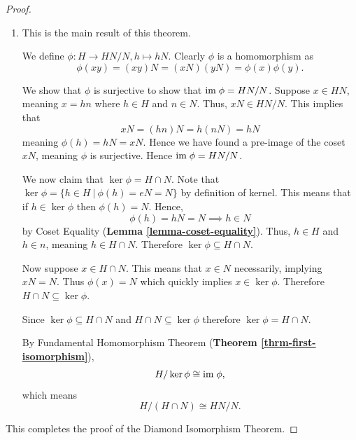 \begin{proof}
\begin{enumerate}
        \item This is the main result of this theorem.

        We define $\phi: H \to HN/N, h \mapsto hN$. Clearly $\phi$ is a homomorphism as
        \[
            \phi(xy) = (xy)N = (xN)(yN) = \phi(x)\phi(y).
        \]

        We show that $\phi$ is surjective to show that $\mathrm{im}\;\phi = HN/N$. Suppose $x \in HN$, meaning $x = hn$ where $h \in H$ and $n \in N$. Thus, $xN \in HN/N$. This implies that
        \[
            xN = (hn)N = h(nN) = hN
        \]
        meaning $\phi(h) = hN = xN$. Hence we have found a pre-image of the coset $xN$, meaning $\phi$ is surjective. Hence $\mathrm{im}\; \phi = HN/N$.

        We now claim that $\ker\phi = H \cap N$. Note that $\ker\phi = \{h \in H \ | \ \phi(h) = eN = N\}$ by definition of kernel. This means that if $h \in \ker\phi$ then $\phi(h) = N$. Hence,
        \[
            \phi(h) = hN = N \implies h \in N
        \]
        by Coset Equality (\textbf{Lemma \ref{lemma-coset-equality}}). Thus, $h \in H$ and $h \in n$, meaning $h \in H \cap N$. Therefore $\ker \phi \subseteq H \cap N$.

        Now suppose $x \in H \cap N$. This means that $x \in N$ necessarily, implying $xN = N$. Thus $\phi(x) = N$ which quickly implies $x \in \ker\phi$. Therefore $H \cap N \subseteq \ker\phi$.

        Since $\ker \phi \subseteq H \cap N$ and  $H \cap N \subseteq \ker\phi$ therefore $\ker\phi = H\cap N$.

        By Fundamental Homomorphism Theorem (\textbf{Theorem \ref{thrm-first-isomorphism}}),
        \[
            H / \ker\phi \cong \mathrm{im}\; \phi,
        \]
        which means
        \[
            H/(H\cap N) \cong HN/N.
        \]
    \end{enumerate}
    This completes the proof of the Diamond Isomorphism Theorem.
\end{proof}

